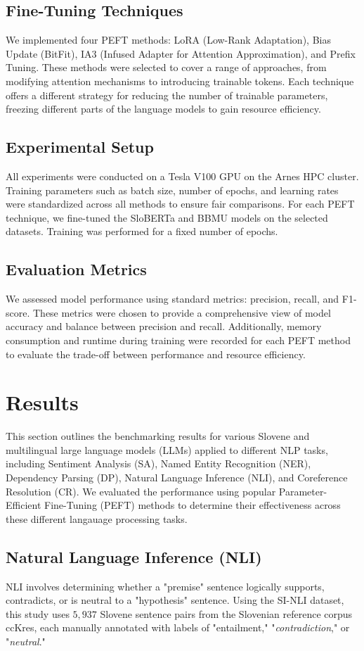 \documentclass[fleqn,moreauthors,10pt]{ds_report}
\begin{document}
\subsection{Fine-Tuning Techniques}
We implemented four PEFT methods: LoRA (Low-Rank Adaptation), Bias Update (BitFit), IA3 (Infused Adapter for Attention Approximation), and Prefix Tuning. These methods were selected to cover a range of approaches, from modifying attention mechanisms to introducing trainable tokens. Each technique offers a different strategy for reducing the number of trainable parameters, freezing different parts of the language models to gain resource efficiency.

\subsection{Experimental Setup}
All experiments were conducted on a Tesla V100 GPU on the Arnes HPC cluster. Training parameters such as batch size, number of epochs, and learning rates were standardized across all methods to ensure fair comparisons. For each PEFT technique, we fine-tuned the SloBERTa and BBMU models on the selected datasets. Training was performed for a fixed number of epochs. 

\subsection{Evaluation Metrics}
We assessed model performance using standard metrics: precision, recall, and F1-score. These metrics were chosen to provide a comprehensive view of model accuracy and balance between precision and recall. Additionally, memory consumption and runtime during training were recorded for each PEFT method to evaluate the trade-off between performance and resource efficiency.

\section{Results}
This section outlines the benchmarking results for various Slovene and multilingual large language models (LLMs) applied to different NLP tasks, including Sentiment Analysis (SA), Named Entity Recognition (NER), Dependency Parsing (DP), Natural Language Inference (NLI), and Coreference Resolution (CR). We evaluated the performance using popular Parameter-Efficient Fine-Tuning (PEFT) methods to determine their effectiveness across these different langauage processing tasks.

\subsection{Natural Language Inference (NLI)}
NLI involves determining whether a "premise" sentence logically supports, contradicts, or is neutral to a "hypothesis" sentence. Using the SI-NLI dataset, this study uses $5,937$ Slovene sentence pairs from the Slovenian reference corpus ccKres, each manually annotated with labels of "entailment," "\textit{contradiction}," or "\textit{neutral}."
\end{document}
